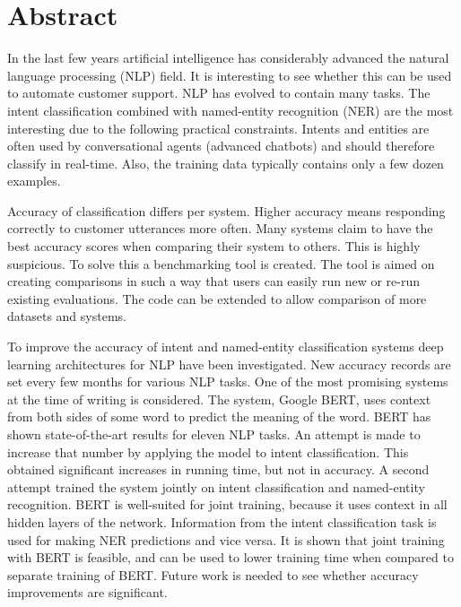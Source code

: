 \chapter*{Abstract}
\label{ch:abstract}

In the last few years artificial intelligence has considerably advanced the natural language processing (NLP) field.
It is interesting to see whether this can be used to automate customer support.
NLP has evolved to contain many tasks.
The intent classification combined with named-entity recognition (NER) are the most interesting due to the following practical constraints.
Intents and entities are often used by conversational agents (advanced chatbots) and should therefore classify in real-time.
Also, the training data typically contains only a few dozen examples.

Accuracy of classification differs per system.
Higher accuracy means responding correctly to customer utterances more often.
Many systems claim to have the best accuracy scores when comparing their system to others.
This is highly suspicious.
To solve this a benchmarking tool is created.
The tool is aimed on creating comparisons in such a way that users can easily run new or re-run existing evaluations.
The code can be extended to allow comparison of more datasets and systems.

To improve the accuracy of intent and named-entity classification systems deep learning architectures for NLP have been investigated.
New accuracy records are set every few months for various NLP tasks.
One of the most promising systems at the time of writing is considered.
The system, Google BERT, uses context from both sides of some word to predict the meaning of the word.
BERT has shown state-of-the-art results for eleven NLP tasks.
An attempt is made to increase that number by applying the model to intent classification.
This obtained significant increases in running time, but not in accuracy.
A second attempt trained the system jointly on intent classification and named-entity recognition.
BERT is well-suited for joint training, because it uses context in all hidden layers of the network.
Information from the intent classification task is used for making NER predictions and vice versa.
It is shown that joint training with BERT is feasible, and can be used to lower training time when compared to separate training of BERT.
Future work is needed to see whether accuracy improvements are significant.
